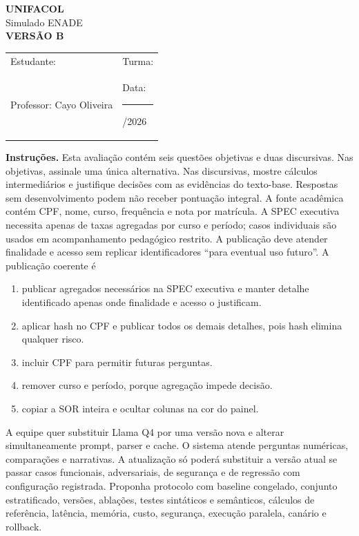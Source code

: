 \documentclass[12pt,a4paper]{article}
\begin{document}
\begin{center}
{\Large\bfseries UNIFACOL}\\[2mm]
{\large Simulado ENADE}\\[1mm]
{\Large\bfseries VERSÃO B}
\end{center}
\begin{DocumentBox}[Identificação]
\begin{tabularx}{\textwidth}{@{}p{}p{}@{}}
Estudante: \hrulefill & Turma: \hrulefill\\[3mm]
Professor: Cayo Oliveira & Data: \rule{2.7cm}{.2pt}/2026
\end{tabularx}
\end{DocumentBox}
\textbf{Instruções.} Esta avaliação contém seis questões objetivas e duas discursivas. Nas objetivas, assinale uma única alternativa. Nas discursivas, mostre cálculos intermediários e justifique decisões com as evidências do texto-base. Respostas sem desenvolvimento podem não receber pontuação integral.
\bigskip
\TextoBase A fonte acadêmica contém CPF, nome, curso, frequência e nota por matrícula. A SPEC executiva necessita apenas de taxas agregadas por curso e período; casos individuais são usados em acompanhamento pedagógico restrito. A publicação deve atender finalidade e acesso sem replicar identificadores ``para eventual uso futuro''.
\FonteDidatica
\Comando A publicação coerente é
\begin{enumerate}[label=\Alph*)]
  \item publicar agregados necessários na SPEC executiva e manter detalhe identificado apenas onde finalidade e acesso o justificam.
  \item aplicar hash no CPF e publicar todos os demais detalhes, pois hash elimina qualquer risco.
  \item incluir CPF para permitir futuras perguntas.
  \item remover curso e período, porque agregação impede decisão.
  \item copiar a SOR inteira e ocultar colunas na cor do painel.
\end{enumerate}

\TextoBase
A equipe quer substituir Llama Q4 por uma versão nova e alterar simultaneamente prompt, parser e cache. O sistema atende perguntas numéricas, comparações e narrativas.
A atualização só poderá substituir a versão atual se passar casos funcionais, adversariais, de segurança e de regressão com configuração registrada.
\FonteDidatica
\Comando Proponha protocolo com baseline congelado, conjunto estratificado, versões, ablações, testes sintáticos e semânticos, cálculos de referência, latência, memória, custo, segurança, execução paralela, canário e rollback.
\EspacoDiscursiva
\end{document}
